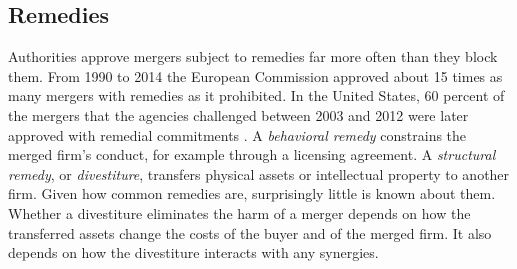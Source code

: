 \subsection{Remedies}\label{sec:11-remedies}

Authorities approve mergers subject to remedies far more often than they block them. From 1990 to 2014 the European
Commission approved about 15 times as many mergers with remedies as it prohibited. In the United States, 60 percent of
the mergers that the agencies challenged between 2003 and 2012 were later approved with remedial commitments
\citep[p.~253]{AskerNocke2021}. A \emph{behavioral remedy} constrains the merged firm's conduct, for example through a
licensing agreement. A \emph{structural remedy}, or \emph{divestiture}, transfers physical assets or intellectual property
to another firm. Given how common remedies are, surprisingly little is known about them. Whether a divestiture
eliminates the harm of a merger depends on how the transferred assets change the costs of the buyer and of the merged
firm. It also depends on how the divestiture interacts with any synergies.

